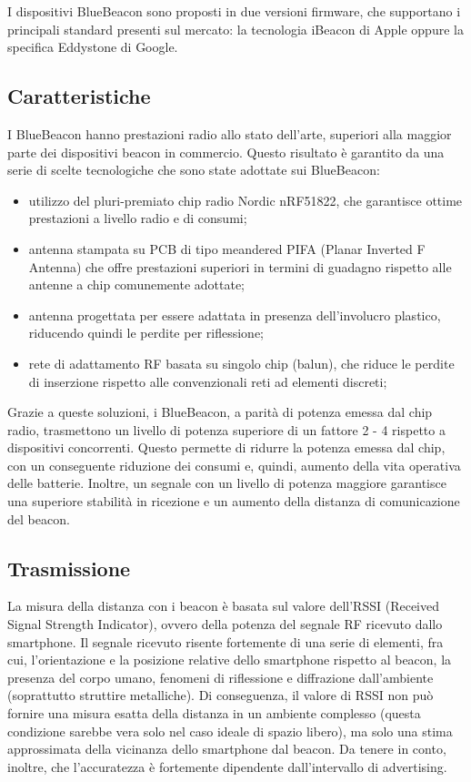 I dispositivi BlueBeacon sono proposti in due versioni firmware, che supportano i principali standard presenti sul mercato: 
la tecnologia iBeacon di Apple oppure la specifica Eddystone di Google.
\subsection{Caratteristiche}
I BlueBeacon hanno prestazioni radio allo stato dell'arte, superiori alla maggior parte dei dispositivi beacon in commercio. 
Questo risultato è garantito da una serie di scelte tecnologiche che sono state adottate sui BlueBeacon:
\begin{itemize}
\item utilizzo del pluri-premiato chip radio Nordic nRF51822, che garantisce ottime prestazioni a livello radio e di consumi;
\item antenna stampata su PCB di tipo meandered PIFA (Planar Inverted F Antenna) che offre prestazioni superiori in termini di guadagno rispetto alle antenne a chip comunemente adottate;
\item antenna progettata per essere adattata in presenza dell'involucro plastico, riducendo quindi le perdite per riflessione;
\item rete di adattamento RF basata su singolo chip (balun), che riduce le perdite di inserzione rispetto alle convenzionali reti ad elementi discreti;
\end{itemize}

Grazie a queste soluzioni, i BlueBeacon, a parità di potenza emessa dal chip radio, trasmettono un livello di potenza superiore di un fattore 2 - 4 rispetto a dispositivi concorrenti. Questo permette di ridurre la potenza emessa dal chip, con un conseguente riduzione dei consumi e, quindi, aumento della vita operativa delle batterie. Inoltre, un segnale con un livello di potenza maggiore garantisce una superiore stabilità in ricezione e un aumento della distanza di comunicazione del beacon. 
\subsection{Trasmissione}
La misura della distanza con i beacon è basata sul valore dell'RSSI (Received Signal Strength Indicator), ovvero della potenza del segnale RF ricevuto dallo smartphone. 
Il segnale ricevuto risente fortemente di una serie di elementi, fra cui, l'orientazione e la posizione relative dello smartphone rispetto al beacon, la presenza del corpo umano, fenomeni di riflessione e diffrazione dall'ambiente (soprattutto struttire metalliche).
Di conseguenza, il valore di RSSI non può fornire una misura esatta della distanza in un ambiente complesso (questa condizione sarebbe vera solo nel caso ideale di spazio libero), ma solo una stima approssimata della vicinanza dello smartphone dal beacon. 
Da tenere in conto, inoltre, che l'accuratezza è fortemente dipendente dall'intervallo di advertising. 

